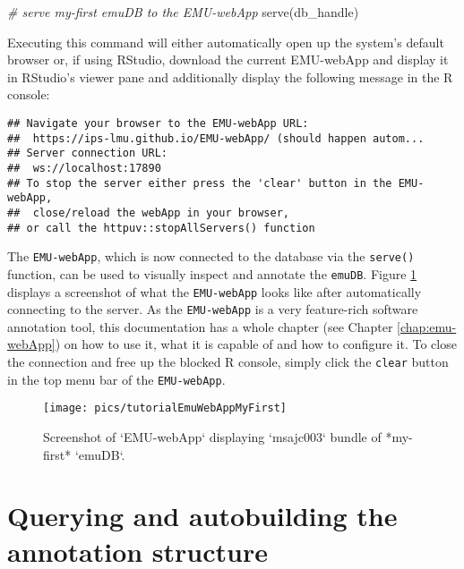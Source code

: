 \documentclass[
]{book}
\newenvironment{Shaded}{\begin{snugshade}}{\end{snugshade}}
\newcommand{\CommentTok}[1]{\textcolor[rgb]{0.56,0.35,0.01}{\textit{#1}}}
\newcommand{\FunctionTok}[1]{\textcolor[rgb]{0.00,0.00,0.00}{#1}}
\newcommand{\NormalTok}[1]{#1}
\begin{document}
\begin{Shaded}
\begin{Highlighting}[]
\CommentTok{\# serve my{-}first emuDB to the EMU{-}webApp}
\FunctionTok{serve}\NormalTok{(db\_handle)}
\end{Highlighting}
\end{Shaded}

Executing this command will either automatically open up the system's default browser or, if using RStudio, download the current EMU-webApp and display it in RStudio's viewer pane and additionally display the following message in the R console:

\begin{verbatim}
## Navigate your browser to the EMU-webApp URL: 
##  https://ips-lmu.github.io/EMU-webApp/ (should happen autom...
## Server connection URL:
##  ws://localhost:17890
## To stop the server either press the 'clear' button in the EMU-webApp, 
##  close/reload the webApp in your browser,
## or call the httpuv::stopAllServers() function
\end{verbatim}

The \texttt{EMU-webApp}, which is now connected to the database via the \texttt{serve()} function, can be used to visually inspect and annotate the \texttt{emuDB}. Figure \ref{fig:tutorial-emuWebAppMyFirst} displays a screenshot of what the \texttt{EMU-webApp} looks like after automatically connecting to the server. As the \texttt{EMU-webApp} is a very feature-rich software annotation tool, this documentation has a whole chapter (see Chapter \ref{chap:emu-webApp}) on how to use it, what it is capable of and how to configure it. To close the connection and free up the blocked R console, simply click the \texttt{clear} button in the top menu bar of the \texttt{EMU-webApp}.

\begin{figure}

{\centering \texttt{[image: pics/tutorialEmuWebAppMyFirst]} 

}

\caption{Screenshot of `EMU-webApp` displaying `msajc003` bundle of *my-first* `emuDB`.}\label{fig:tutorial-emuWebAppMyFirst}
\end{figure}

\hypertarget{querying-and-autobuilding-the-annotation-structure}{%
\section{Querying and autobuilding the annotation structure}\label{querying-and-autobuilding-the-annotation-structure}}
\end{document}
